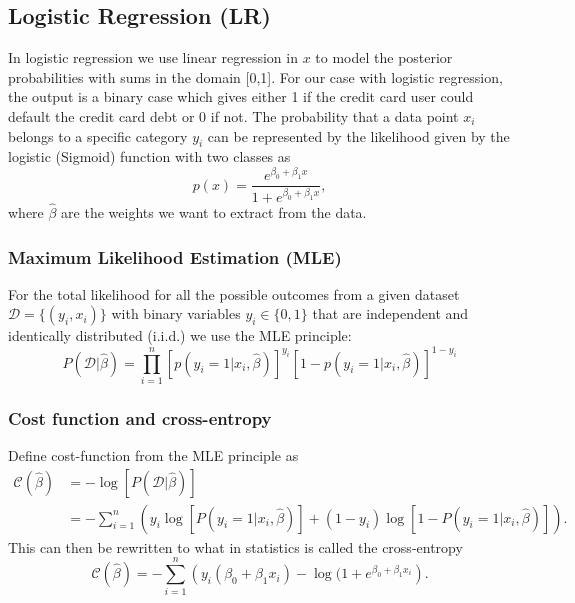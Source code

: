\documentclass[12pt,a4paper,english]{article}
\begin{document}
\subsection{Logistic Regression (LR)}
In logistic regression we use linear regression in $x$ to model the posterior probabilities with sums in the domain [0,1]. For our case with logistic regression, the output is a binary case which gives either 1 if the credit card user could default the credit card debt or 0 if not. The probability that a data point $x_i$ belongs to a specific category $y_i$ can be represented by the likelihood given by the logistic (Sigmoid) function with two classes as
\begin{equation}
\label{eq:sigmoid}
p(x)=\frac{e^{\beta_0+\beta_1x}}{1+e^{\beta_0+\beta_1x}},
\end{equation}
where $\hat{\beta}$ are the weights we want to extract from the data.

\subsubsection{Maximum Likelihood Estimation (MLE)}
For the total likelihood for all the possible outcomes from a given dataset $\mathcal{D}=\{(y_i, x_i)\}$ with binary variables $y_i\in\{0,1\}$ that are independent and identically distributed (i.i.d.) we use the MLE principle:
\begin{equation}
\label{eq:max_likelihood}
P(\mathcal{D}|\hat{\beta})=\prod_{i=1}^{n}\left[p(y_i=1|x_i,\hat{\beta})\right]^{y_i}\left[1-p(y_i=1|x_i,\hat{\beta})\right]^{1-y_i}
\end{equation}

\subsubsection{Cost function and cross-entropy}
Define cost-function from the MLE principle as 
\begin{align}
\mathcal{C}(\hat{\beta})&=-\log[P(\mathcal{D}|\hat{\beta})]\nonumber\\
\label{eq:cost_func}
&= -\sum_{i=1}^{n}\left(y_i\log[P(y_i=1|x_i,\hat{\beta})]+(1-y_i)\log[1-P(y_i=1|x_i,\hat{\beta})]\right).
\end{align}
This can then be rewritten to what in statistics is called the cross-entropy
\begin{equation}
\label{eq:cross_entropy}
\mathcal{C}(\hat{\beta})=-\sum_{i=1}^{n}\left(y_i(\beta_0+\beta_1x_i)-\log(1+e^{\beta_0+\beta_1x_i}\right).
\end{equation}
\end{document}
